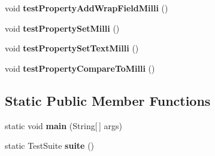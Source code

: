 \begin{DoxyCompactItemize}
\item 
\hypertarget{classorg_1_1joda_1_1time_1_1_test_time_of_day___properties_ab1874130351e0bba057ed67859c6e971}{void {\bfseries test\-Property\-Add\-Wrap\-Field\-Milli} ()}\label{classorg_1_1joda_1_1time_1_1_test_time_of_day___properties_ab1874130351e0bba057ed67859c6e971}

\item 
\hypertarget{classorg_1_1joda_1_1time_1_1_test_time_of_day___properties_a358d474a014e3e8883cb43ca77df50d7}{void {\bfseries test\-Property\-Set\-Milli} ()}\label{classorg_1_1joda_1_1time_1_1_test_time_of_day___properties_a358d474a014e3e8883cb43ca77df50d7}

\item 
\hypertarget{classorg_1_1joda_1_1time_1_1_test_time_of_day___properties_addd432498df858ba4ecc39b1b505c5ee}{void {\bfseries test\-Property\-Set\-Text\-Milli} ()}\label{classorg_1_1joda_1_1time_1_1_test_time_of_day___properties_addd432498df858ba4ecc39b1b505c5ee}

\item 
\hypertarget{classorg_1_1joda_1_1time_1_1_test_time_of_day___properties_a78568cac681b1c3952b6d3808d45f886}{void {\bfseries test\-Property\-Compare\-To\-Milli} ()}\label{classorg_1_1joda_1_1time_1_1_test_time_of_day___properties_a78568cac681b1c3952b6d3808d45f886}

\end{DoxyCompactItemize}
\subsection*{Static Public Member Functions}
\begin{DoxyCompactItemize}
\item 
\hypertarget{classorg_1_1joda_1_1time_1_1_test_time_of_day___properties_a5031f74a716cc5eacb56fcf819ff6214}{static void {\bfseries main} (String\mbox{[}$\,$\mbox{]} args)}\label{classorg_1_1joda_1_1time_1_1_test_time_of_day___properties_a5031f74a716cc5eacb56fcf819ff6214}

\item 
\hypertarget{classorg_1_1joda_1_1time_1_1_test_time_of_day___properties_abcc423a8643c933dce34dd997b202289}{static Test\-Suite {\bfseries suite} ()}\label{classorg_1_1joda_1_1time_1_1_test_time_of_day___properties_abcc423a8643c933dce34dd997b202289}

\end{DoxyCompactItemize}
